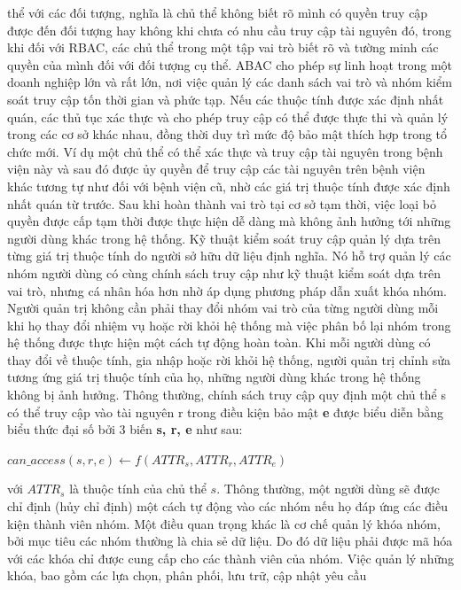 thể với các đối tượng, nghĩa là chủ thể không biết rõ mình có quyền truy cập được đến
đối tượng hay không khi chưa có nhu cầu truy cập tài nguyên đó, trong khi đối với
RBAC, các chủ thể trong một tập vai trò biết rõ và tường minh các quyền của mình đối
với đối tượng cụ thể. ABAC cho phép sự linh hoạt trong một doanh nghiệp lớn và rất
lớn, nơi việc quản lý các danh sách vai trò và nhóm kiểm soát truy cập tốn thời gian và
phức tạp. Nếu các thuộc tính được xác định nhất quán, các thủ tục xác thực và cho phép
truy cập có thể được thực thi và quản lý trong các cơ sở khác nhau, đồng thời duy trì
mức độ bảo mật thích hợp trong tổ chức mới. Ví dụ một chủ thể có thể xác thực và truy
cập tài nguyên trong bệnh viện này và sau đó được ủy quyền để truy cập các tài nguyên
trên bệnh viện khác tương tự như đối với bệnh viện cũ, nhờ các giá trị thuộc tính được
xác định nhất quán từ trước. Sau khi hoàn thành vai trò tại cơ sở tạm thời, việc loại bỏ quyền được cấp tạm thời được thực hiện dễ dàng mà không ảnh hưởng tới những người
dùng khác trong hệ thống. 
\indent Kỹ thuật kiểm soát truy cập quản lý dựa trên từng giá trị thuộc tính do người sở
hữu dữ liệu định nghĩa. Nó hỗ trợ quản lý các nhóm người dùng có cùng chính sách truy
cập như kỹ thuật kiểm soát dựa trên vai trò, nhưng cá nhân hóa hơn nhờ áp dụng phương
pháp dẫn xuất khóa nhóm. Người quản trị không cần phải thay đổi nhóm vai trò của từng
người dùng mỗi khi họ thay đổi nhiệm vụ hoặc rời khỏi hệ thống mà việc phân bố lại
nhóm trong hệ thống được thực hiện một cách tự động hoàn toàn. Khi mỗi người dùng
có thay đổi về thuộc tính, gia nhập hoặc rời khỏi hệ thống, người quản trị chỉnh sửa
tương ứng giá trị thuộc tính của họ, những người dùng khác trong hệ thống không bị ảnh
hưởng. Thông thường, chính sách truy cập quy định một chủ thể s có thể truy cập vào
tài nguyên r trong điều kiện bảo mật \textbf{e} được biểu diễn bằng biểu thức đại số bởi 3 biến \textbf{s, r, e} như sau:
\begin{center}
$can\_access(s, r, e) \leftarrow f(ATTR_{s},ATTR_{r}, ATTR_{e})$ \cite{yuan2005attributed}
\end{center} với $ATTR_{s}$ là thuộc tính của chủ thể $s$. 
\indent Thông thường, một người dùng sẽ được chỉ định (hủy chỉ định) một cách tự động
vào các nhóm nếu họ đáp ứng các điều kiện thành viên nhóm. Một điều quan trọng khác
là cơ chế quản lý khóa nhóm, bởi mục tiêu các nhóm thường là chia sẻ dữ liệu. Do đó
dữ liệu phải được mã hóa với các khóa chỉ được cung cấp cho các thành viên của nhóm.
Việc quản lý những khóa, bao gồm các lựa chọn, phân phối, lưu trữ, cập nhật yêu cầu
